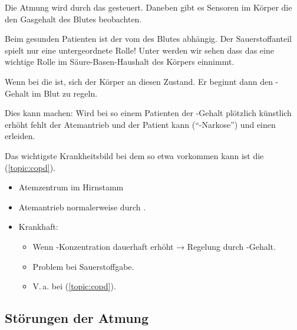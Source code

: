 



{
Die Atmung wird durch das  gesteuert. Daneben gibt
es Sensoren im Körper die den Gasgehalt des Blutes beobachten. 

Beim gesunden Patienten ist der  vom  des
Blutes abhängig. Der Sauerstoffanteil spielt nur eine untergeordnete Rolle!
Unter  werden wir sehen dass das 
eine wichtige Rolle im Säure-Basen-Haushalt des Körpers einnimmt.  

Wenn bei  die  ist,  sich der Körper an diesen Zustand. Er beginnt
dann den -Gehalt im Blut zu regeln.

Dies kann  machen: Wird bei so einem Patienten der -Gehalt
plötzlich künstlich erhöht fehlt der Atemantrieb und der Patient kann
 ("`-Narkose"') und einen
 erleiden.

Das wichtigste Krankheitsbild bei dem so etwa vorkommen kann ist die
 (\ref{topic:copd}). 
}{
\begin{itemize}
  \item Atemzentrum im Hirnstamm
  \item Atemantrieb normalerweise durch .
  \item Krankhaft:
  \begin{itemize}
    \item Wenn -Konzentration dauerhaft erhöht → Regelung durch
    -Gehalt.
    \item Problem bei Sauerstoffgabe.
    \item V.\,a. bei  (\ref{topic:copd}).
  \end{itemize}
\end{itemize}
}{}{}{}






\subsection{Störungen der Atmung}

